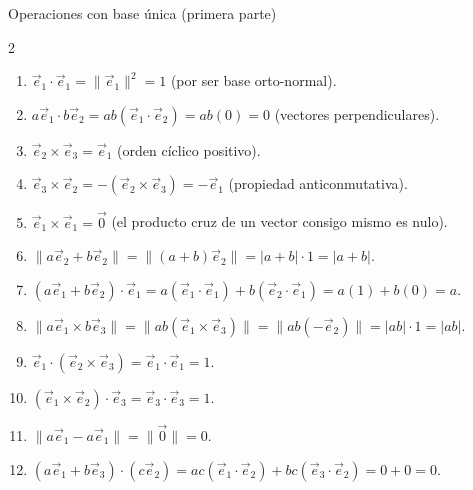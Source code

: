 \begin{solucion}{Operaciones con base única (primera parte)}
\begin{multicols}{2} 
\begin{enumerate}
    \item $\vec{e}_1 \cdot \vec{e}_1 = \|\vec{e}_1\|^2 = 1$ (por ser base orto-normal).
    \item $a\vec{e}_1 \cdot b\vec{e}_2 = ab(\vec{e}_1 \cdot \vec{e}_2) = ab(0) = 0$ (vectores perpendiculares).
    \item $\vec{e}_2 \times \vec{e}_3 = \vec{e}_1$ (orden cíclico positivo).
    \item $\vec{e}_3 \times \vec{e}_2 = -(\vec{e}_2 \times \vec{e}_3) = -\vec{e}_1$ (propiedad anticonmutativa).
    \item $\vec{e}_1 \times \vec{e}_1 = \vec{0}$ (el producto cruz de un vector consigo mismo es nulo).
    \item $\| a\vec{e}_2 + b\vec{e}_2 \| = \|(a+b)\vec{e}_2\| = |a+b| \cdot 1 = |a+b|$.
    \item $(a\vec{e}_1 + b\vec{e}_2) \cdot \vec{e}_1 = a(\vec{e}_1 \cdot \vec{e}_1) + b(\vec{e}_2 \cdot \vec{e}_1) = a(1) + b(0) = a$.
    \item $\| a\vec{e}_1 \times b\vec{e}_3 \| = \| ab(\vec{e}_1 \times \vec{e}_3) \| = \| ab(-\vec{e}_2) \| = |ab| \cdot 1 = |ab|$.
    \item $\vec{e}_1 \cdot (\vec{e}_2 \times \vec{e}_3) = \vec{e}_1 \cdot \vec{e}_1 = 1$.
    \item $(\vec{e}_1 \times \vec{e}_2) \cdot \vec{e}_3 = \vec{e}_3 \cdot \vec{e}_3 = 1$.
    \item $\| a\vec{e}_1 - a\vec{e}_1 \| = \| \vec{0} \| = 0$.
    \item $(a\vec{e}_1 + b\vec{e}_3) \cdot (c\vec{e}_2) = ac(\vec{e}_1 \cdot \vec{e}_2) + bc(\vec{e}_3 \cdot \vec{e}_2) = 0 + 0 = 0$.
\end{enumerate}
\end{multicols}
\end{solucion}

